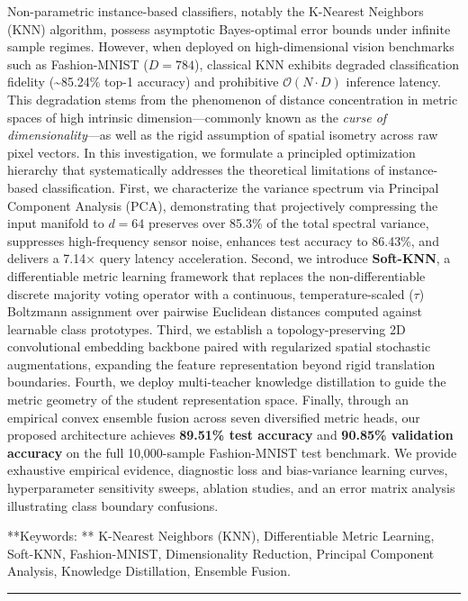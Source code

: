 Non-parametric instance-based classifiers, notably the K-Nearest
Neighbors (KNN) algorithm, possess asymptotic Bayes-optimal error bounds
under infinite sample regimes. However, when deployed on
high-dimensional vision benchmarks such as Fashion-MNIST (\(D = 784\)),
classical KNN exhibits degraded classification fidelity
(\textasciitilde85.24\% top-1 accuracy) and prohibitive
\(\mathcal{O}(N \cdot D)\) inference latency. This degradation stems
from the phenomenon of distance concentration in metric spaces of high
intrinsic dimension---commonly known as the \emph{curse of
dimensionality}---as well as the rigid assumption of spatial isometry
across raw pixel vectors. In this investigation, we formulate a
principled optimization hierarchy that systematically addresses the
theoretical limitations of instance-based classification. First, we
characterize the variance spectrum via Principal Component Analysis
(PCA), demonstrating that projectively compressing the input manifold to
\(d=64\) preserves over 85.3\% of the total spectral variance,
suppresses high-frequency sensor noise, enhances test accuracy to
86.43\%, and delivers a 7.14× query latency acceleration. Second, we
introduce \textbf{Soft-KNN}, a differentiable metric learning framework
that replaces the non-differentiable discrete majority voting operator
with a continuous, temperature-scaled (\(\tau\)) Boltzmann assignment
over pairwise Euclidean distances computed against learnable class
prototypes. Third, we establish a topology-preserving 2D convolutional
embedding backbone paired with regularized spatial stochastic
augmentations, expanding the feature representation beyond rigid
translation boundaries. Fourth, we deploy multi-teacher knowledge
distillation to guide the metric geometry of the student representation
space. Finally, through an empirical convex ensemble fusion across seven
diversified metric heads, our proposed architecture achieves
\textbf{89.51\% test accuracy} and \textbf{90.85\% validation accuracy}
on the full 10,000-sample Fashion-MNIST test benchmark. We provide
exhaustive empirical evidence, diagnostic loss and bias-variance
learning curves, hyperparameter sensitivity sweeps, ablation studies,
and an error matrix analysis illustrating class boundary confusions.

**Keywords: ** K-Nearest Neighbors (KNN), Differentiable Metric
Learning, Soft-KNN, Fashion-MNIST, Dimensionality Reduction, Principal
Component Analysis, Knowledge Distillation, Ensemble Fusion.

\begin{center}\rule{0.5\linewidth}{0.5pt}\end{center}



